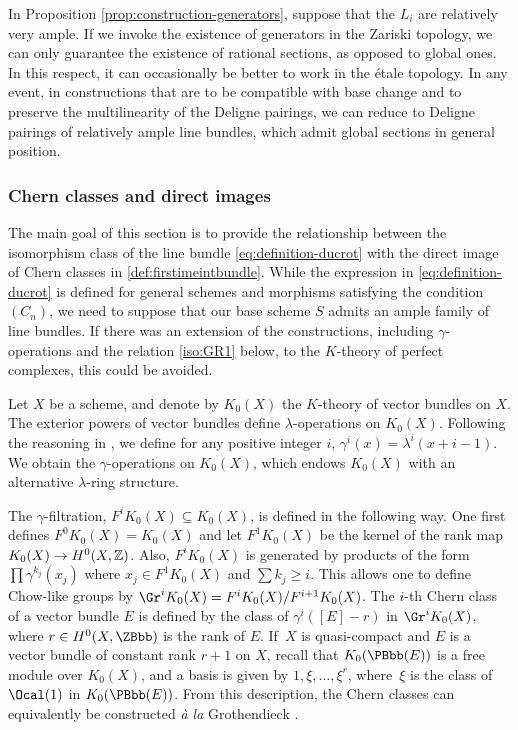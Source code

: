 \begin{remark}
In Proposition \ref{prop:construction-generators}, suppose that the $L_{i}$ are relatively very ample. If we invoke the existence of generators in the Zariski topology, we can only guarantee the existence of rational sections, as opposed to global ones. In this respect, it can occasionally be better to work in the étale topology. In any event, in constructions that are to be compatible with base change and to preserve the multilinearity of the Deligne pairings, we can reduce to Deligne pairings of relatively ample line bundles, which admit global sections in general position.
\end{remark}

\subsubsection{Chern classes and direct images}\label{subsub:Cherndirect}

The main goal of this section is to provide the relationship between the isomorphism class of the line bundle \eqref{eq:definition-ducrot} with the direct image of Chern classes in \eqref{def:firstimeintbundle}. While the expression in \eqref{eq:definition-ducrot} is defined for general schemes and morphisms satisfying the condition $(C_n)$, we need to suppose that our base scheme $S$ admits an ample family of line bundles. If there was an extension of the constructions, including $\gamma$-operations and the relation \eqref{iso:GR1} below, to the $K$-theory of perfect complexes, this could be avoided.

Let $X$ be a scheme, and denote by $K_{0}(X)$ the $K$-theory of vector bundles on $X$. The exterior powers of vector bundles define $\lambda$-operations on $K_0(X)$. Following the reasoning in \cite[Exp.\,V, \S 3]{SGA6}, we define for any positive integer $i$, $\gamma^i(x) = \lambda^i(x+i-1)$. We obtain the $\gamma$-operations on $K_0(X)$, which endows $K_0(X)$ with an alternative $\lambda$\nobreakdash-ring structure.

The $\gamma$-filtration, $F^i K_0(X) \subseteq K_0(X)$, is defined in the following way. One first defines \hbox{$F^0 K_0(X) =K_0(X)$} and let $F^1 K_0(X)$ be the kernel of the rank map $K_0(X) \to\nobreak H^0(X, \mathbb{Z})$. Also, $F^i K_0(X)$ is generated by products of the form $\prod \gamma^{k_j}(x_j)$ where $x_j \in F^1 K_0(X)$ and $\sum k_j \geq i$. This allows one to define Chow-like groups by $\Gr^i K_0(X) = F^i K_0(X)/F^{i+1}K_0(X)$. The $i$-th Chern class of a vector bundle $E$ is defined by the class of $\gamma^{i}([E]-r)$ in $\Gr^i K_0(X)$, where $r \in H^0(X, \ZBbb)$ is the rank of $E$. If~$X$ is quasi-compact and $E$ is a vector bundle of constant rank $r+1$ on $X$, recall that $K_{0}(\PBbb(E))$ is a free module over $K_{0}(X)$, and a basis is given by $1,\xi,\ldots, \xi^{r}$, where~$\xi$ is the class of $\Ocal(1)$ in $K_{0}(\PBbb(E))$. From this description, the Chern classes can equivalently be constructed \emph{à la} Grothendieck \cite[Exp.\,VI, \S 5]{SGA6}.

